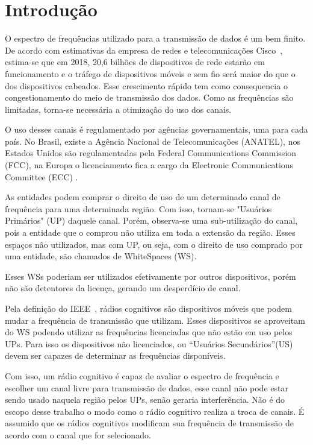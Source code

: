 \chapter{Introdução}

O espectro de frequências utilizado para a transmissão de dados é um bem finito. De acordo com estimativas da empresa de redes e telecomunicações Cisco~\cite{ciscoforecast}, estima-se que em 2018, 20,6 bilhões de dispositivos de rede estarão em funcionamento e o tráfego de dispositivos móveis e sem fio será maior do que o dos dispositivos cabeados. Esse crescimento rápido tem como consequencia o congestionamento do meio de transmissão dos dados. Como as frequências são limitadas, torna-se necessária a otimização do uso dos canais.

O uso desses canais é regulamentado por agências governamentais, uma para cada país. No Brasil, existe a Agência Nacional de Telecomunicações (ANATEL),
nos Estados Unidos são regulamentadas pela Federal Communications Commission (FCC),
na Europa o licenciamento fica a cargo da Electronic Communications Committee (ECC)
.

As entidades podem comprar o direito de uso de um determinado canal de frequência para uma determinada região. Com isso, tornam-se "Usuários Primários" (UP)  daquele canal. Porém, observa-se uma sub-utilização do canal, pois a entidade que o comprou não utiliza em toda a extensão da região. Esses espaços não utilizados, mas com UP, ou seja, com o direito de uso comprado por uma entidade, são chamados de WhiteSpaces (WS).
  
Esses WSs poderiam ser utilizados efetivamente por outros dispositivos, porém não são detentores da licença, gerando um desperdício de canal.

Pela definição do IEEE~\cite{ieee80222}, rádios cognitivos são dispositivos móveis que podem mudar a frequência de transmissão que utilizam. Esses dispositivos se aproveitam do WS podendo utilizar as frequências licenciadas que não estão em uso pelos UPs. Para isso os dispositivos não licenciados, ou ``Usuários Secundários''(US)
devem ser capazes de determinar as frequências disponíveis.

Com isso, um rádio cognitivo é capaz de avaliar o espectro de frequência e escolher um canal livre para transmissão de dados, esse canal não pode estar sendo usado naquela região pelos UPs, senão geraria interferência. Não é do escopo desse trabalho o modo como o rádio cognitivo realiza a troca de canais. É assumido que os rádios cognitivos modificam sua frequência de transmissão de acordo com o canal que for selecionado.

